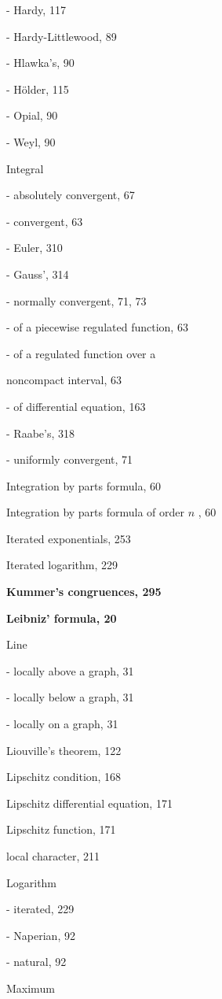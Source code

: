 - Hardy, 117

- Hardy-Littlewood, 89

- Hlawka's, 90

- Hölder, 115

- Opial, 90

- Weyl, 90

Integral

- absolutely convergent, 67

- convergent, 63

- Euler, 310

- Gauss', 314

- normally convergent, 71, 73

- of a piecewise regulated function, 63

- of a regulated function over a

noncompact interval, 63

- of differential equation, 163

- Raabe's, 318

- uniformly convergent, 71

Integration by parts formula, 60

Integration by parts formula of order \(n\) , 60

Iterated exponentials, 253

Iterated logarithm, 229

\par\noindent\textbf{Kummer's congruences, 295}\par

\par\noindent\textbf{Leibniz' formula, 20}\par

Line

- locally above a graph, 31

- locally below a graph, 31

- locally on a graph, 31

Liouville's theorem, 122

Lipschitz condition, 168

Lipschitz differential equation, 171

Lipschitz function, 171

local character, 211

Logarithm

- iterated, 229

- Naperian, 92

- natural, 92

Maximum

